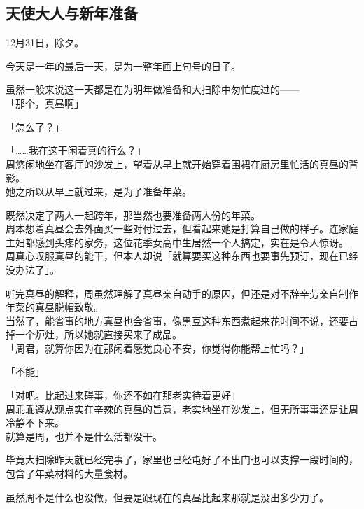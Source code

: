 \subsection{天使大人与新年准备}

12月31日，除夕。

今天是一年的最后一天，是为一整年画上句号的日子。

虽然一般来说这一天都是在为明年做准备和大扫除中匆忙度过的——\\

「那个，真昼啊」

「怎么了？」

「……我在这干闲着真的行么？」\\

周悠闲地坐在客厅的沙发上，望着从早上就开始穿着围裙在厨房里忙活的真昼的背影。\\

她之所以从早上就过来，是为了准备年菜。

既然决定了两人一起跨年，那当然也要准备两人份的年菜。\\

周本想着真昼会去外面买一些对付过去，但看起来她是打算自己做的样子。连家庭主妇都感到头疼的家务，这位花季女高中生居然一个人搞定，实在是令人惊讶。\\

周真心叹服真昼的能干，但本人却说「就算要买这种东西也要事先预订，现在已经没办法了」。

听完真昼的解释，周虽然理解了真昼亲自动手的原因，但还是对不辞辛劳亲自制作年菜的真昼脱帽致敬。\\

当然了，能省事的地方真昼也会省事，像黑豆这种东西煮起来花时间不说，还要占掉一个炉灶，所以她就直接买来了成品。\\

「周君，就算你因为在那闲着感觉良心不安，你觉得你能帮上忙吗？」

「不能」

「对吧。比起过来碍事，你还不如在那老实待着更好」\\

周乖乖遵从观点实在辛辣的真昼的旨意，老实地坐在沙发上，但无所事事还是让周冷静不下来。\\

就算是周，也并不是什么活都没干。

毕竟大扫除昨天就已经完事了，家里也已经屯好了不出门也可以支撑一段时间的，包含了年菜材料的大量食材。

虽然周不是什么也没做，但要是跟现在的真昼比起来那就是没出多少力了。\\

